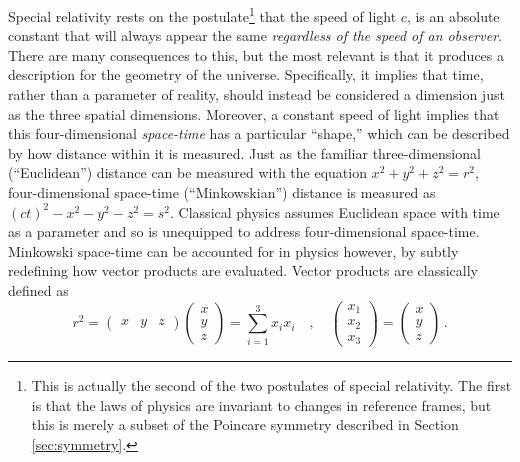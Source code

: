     Special relativity rests on the postulate\footnote{
            This is actually the second of the two postulates of special relativity.
            The first is that the laws of physics are invariant to changes in reference frames,
                but this is merely a subset of the Poincare symmetry described in Section \ref{sec:symmetry}.
        } that the speed of light $c$,
        is an absolute constant that will always appear the same
        \textit{regardless of the speed of an observer}.
    There are many consequences to this, but the most relevant is that
        it produces a description for the geometry of the universe.
    Specifically, it implies that time, rather than a parameter of reality,
        should instead be considered a dimension just as the three spatial dimensions.
    Moreover, a constant speed of light implies that this four-dimensional \textit{space-time} has a particular ``shape,''
        which can be described by how distance within it is measured.
    Just as the familiar three-dimensional (``Euclidean'') distance can be measured with the equation $x^2+y^2+z^2=r^2$,
        four-dimensional space-time (``Minkowskian'') distance is measured as $(ct)^2-x^2-y^2-z^2 = s^2$.
    Classical physics assumes Euclidean space with time as a parameter
        and so is unequipped to address four-dimensional space-time.
    Minkowski space-time can be accounted for in physics however,
        by subtly redefining how vector products are evaluated.
    Vector products are classically defined as 
    \begin{equation}
        r^2 = \begin{pmatrix} x & y & z\end{pmatrix} \begin{pmatrix} x \\ y \\ z \end{pmatrix} = \sum\limits_{i=1}^3 x_i x_i
        \quad , \quad \begin{pmatrix}x_1 \\ x_2 \\ x_3 \end{pmatrix} = \begin{pmatrix} x \\ y \\ z \end{pmatrix} 
        \,.
    \end{equation}

